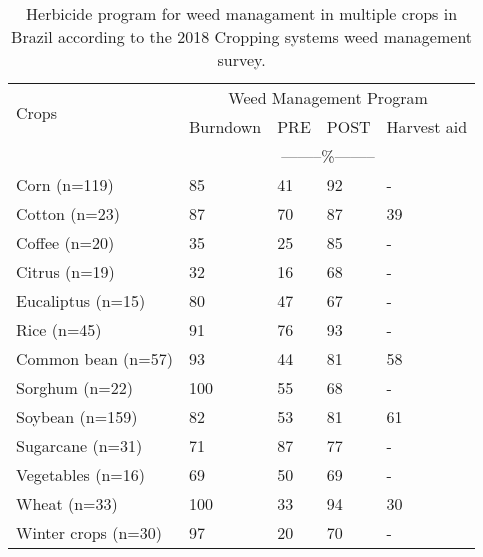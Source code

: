 \documentclass[
  12pt,
  a4paper]{article}
\begin{document}
\begin{table}[ht!]
\centering
\caption{Herbicide program for weed managament in multiple crops in Brazil according to the 2018 Cropping systems weed management survey.}
\label{tab:my-table}
\begin{tabular}{lllll}
\hline
\multirow{2}{*}{Crops} & \multicolumn{4}{c}{Weed Management Program}             \\ \cline{2-5} 
                       & Burndown & PRE & POST & Harvest aid \\ \hline
                       & \multicolumn{4}{c}{--------\%--------}                  \\
Corn (n=119)           & 85       & 41            & 92             & -           \\
Cotton (n=23)          & 87       & 70            & 87             & 39          \\
Coffee (n=20)          & 35       & 25            & 85             & -           \\
Citrus (n=19)          & 32       & 16            & 68             & -           \\
Eucaliptus (n=15)      & 80       & 47            & 67             & -           \\
Rice (n=45)            & 91       & 76            & 93             & -           \\
Common bean (n=57)     & 93       & 44            & 81             & 58          \\
Sorghum (n=22)         & 100      & 55            & 68             & -           \\
Soybean (n=159)        & 82       & 53            & 81             & 61          \\
Sugarcane (n=31)       & 71       & 87            & 77             & -           \\
Vegetables (n=16)      & 69       & 50            & 69             & -           \\
Wheat (n=33)           & 100      & 33            & 94             & 30          \\
Winter crops (n=30)    & 97       & 20            & 70             & -           \\ \hline
\end{tabular}
\end{table}

\newpage
\end{document}
